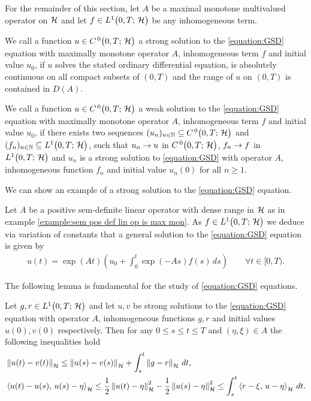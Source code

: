 For the remainder of this section, let $ A $ 
be a maximal monotone multivalued operator on $ \mathcal{H} $
and let $ f\in L^{1}\big(0,T;\,\mathcal{H}\big) $ be any inhomogeneous term.\medskip

\begin{definition}
	We call a function $ u\in C^{\, 0}\big(0,T;\,\mathcal{H}\big) $ a strong solution to the 
	\ref{equation:GSD} equation with maximally monotone operator $ A $, 
	inhomogeneous term $ f $ and initial value $ u_0 $, 
	if $ u $ solves the stated ordinary differential equation, 
	is absolutely continuous 
	on all compact subsets of $ (0,T) $ and the range of $ u $
	on $ (0,T) $ is contained in $ D(A) $.
\end{definition}

\begin{definition}
	We call a function $ u\in C^{\, 0}\big(0,T;\,\mathcal{H}\big) $ a weak solution to the 
	\ref{equation:GSD} equation with maximally monotone operator $ A $, inhomogeneous
	term $ f $ and initial value $ u_0 $, if 
	there exists two sequences $ (u_n)_{n\in\mathbb{N}}\subseteq C^{\, 0}\big(0,T;\,\mathcal{H}\big)$ and 
	$ (f_n)_{n\in\mathbb{N}}\subseteq L^{1}\big(0,T;\,\mathcal{H}\big) $, such that 
	$ u_n \rightarrow u $ in $ C^{\, 0}\big(0,T;\,\mathcal{H}\big) $, $ f_n\rightarrow f $ in $L^{1}\big(0,T;\,\mathcal{H}\big)$ and  
	$u_n $ is a strong
	solution to \ref{equation:GSD}
	with operator $ A $, inhomogeneous function $ f_n $ and
	initial value $ u_n(0) $ for all $ n \geq 1 $.
\end{definition}

We can show an example of a strong solution to the 
\ref{equation:GSD} equation.

\begin{example}
	Let $ A $ be a positive sem-definite linear operator
	with dense range in $ \mathcal{H} $
	as in example \ref{example:sem pos def lin op is max mon}.
	As $ f\in L^{1}\big(0,T;\,\mathcal{H}\big) $ we deduce via variation of constants that
	a general solution to the \ref{equation:GSD} equation
	is given by
	\begin{align*}
		u(t)=\exp(At)\left(u_0+\int_0^t \exp(-As)f(s)\,ds\right)
		\qquad\forall t\in [0,T).
	\end{align*}
\end{example}

The following lemma is fundamental for the study of \ref{equation:GSD}
equations.

\begin{lemma}\label{lemma:inequalities of weak sol}
	Let $ g,r\in L^{1}\big(0,T;\,\mathcal{H}\big) $ and let $ u,v $ be strong solutions
	to the \ref{equation:GSD} equation 
	with operator $ A $, inhomogeneous functions $ g,r $ 
	and initial values $ u(0),v(0) $ respectively.
	Then for any $ 0\leq s \leq t \leq T $ and $ (\eta,\xi)\in A $
	the following inequalities hold
	\begin{align}
			&\left\Vert u(t)-v(t)\right\Vert_{\mathcal{H}}
			\leq \left\Vert u(s)-v(s)\right\Vert_{\mathcal{H}}
			+\int_s^t \left\Vert g-r\right\Vert_{\mathcal{H}}\,dt,\label{eq:bound diff between two sol}\\
			&\left\langle u(t)-u(s),\,u(s)-\eta\right\rangle_{\mathcal{H}}
			\leq \frac{1}{2}\left\Vert u(t)-\eta \right\Vert_{\mathcal{H}}^2-\frac{1}{2}\left\Vert u(s)-\eta\right\Vert_{\mathcal{H}}^2
			\leq \int_s^t \left\langle r-\xi,\,u-\eta\right\rangle_{\mathcal{H}}\,dt.
			\label{eq:bound diff from graph}
	\end{align}
\end{lemma}

